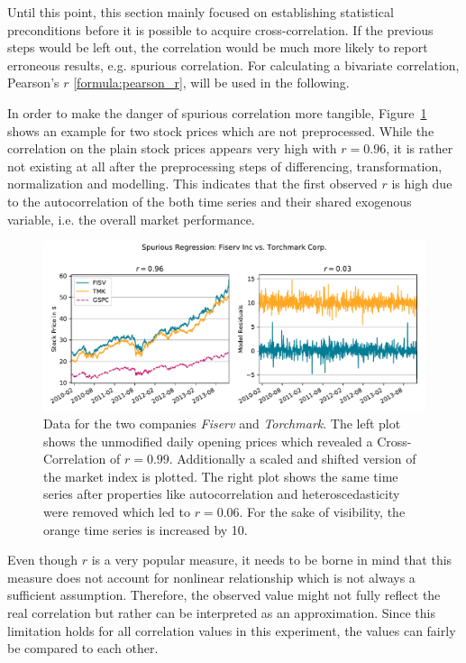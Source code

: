 Until this point, this section mainly focused on establishing statistical preconditions before it is possible to acquire cross-correlation. If the previous steps would be left out, the correlation would be much more likely to report erroneous results, e.g. spurious correlation. For calculating a bivariate correlation, Pearson's $r$ \eqref{formula:pearson_r}, will be used in the following.


In order to make the danger of spurious correlation more tangible, Figure~\ref{fig:spurious_regression} shows an example for two stock prices which are not preprocessed. While the correlation on the plain stock prices appears very high with $r=0.96$, it is rather not existing at all after the preprocessing steps of differencing, transformation, normalization and modelling. This indicates that the first observed $r$ is high due to the autocorrelation of the both time series and their shared exogenous variable, i.e. the overall market performance.

\begin{figure}[!ht]
    \centering
    \includegraphics[width=\textwidth]{figures/regression/spurious-FISV-TMK.pdf}
    \caption{Data for the two companies \emph{Fiserv} and \emph{Torchmark}. The left plot shows the unmodified daily opening prices which revealed a Cross-Correlation of $r=0.99$. Additionally a scaled and shifted version of the market index is plotted. The right plot shows the same time series after properties like autocorrelation and heteroscedasticity were removed which led to $r=0.06$. For the sake of visibility, the orange time series is increased by 10.}
    \label{fig:spurious_regression}
\end{figure}

Even though $r$ is a very popular measure, it needs to be borne in mind that this measure does not account for nonlinear relationship which is not always a sufficient assumption. Therefore, the observed value might not fully reflect the real correlation but rather can be interpreted as an approximation. Since this limitation holds for all correlation values in this experiment, the values can fairly be compared to each other.

